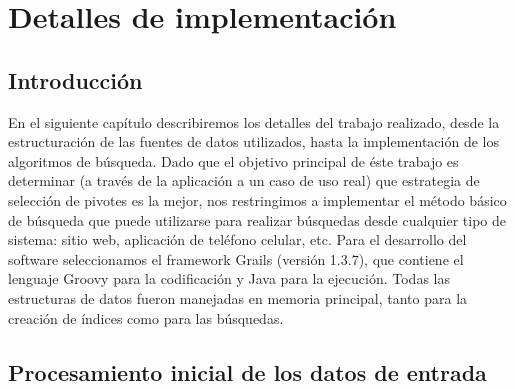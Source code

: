 \chapter{Detalles de implementaci\'on}

\section{Introducci\'on}
En el siguiente cap\'itulo describiremos los detalles del trabajo realizado, 
desde la estructuraci\'on de las fuentes de datos utilizados, hasta la 
implementaci\'on de los algoritmos de b\'usqueda.
Dado que el objetivo principal de \'este trabajo es determinar (a trav\'es de 
la aplicaci\'on a un caso de uso real) que estrategia de selecci\'on de pivotes 
es la mejor, nos restringimos a implementar el m\'etodo b\'asico de b\'usqueda que 
puede utilizarse para realizar b\'usquedas desde cualquier tipo de sistema: sitio 
web, aplicaci\'on de tel\'efono celular, etc.
Para el desarrollo del software seleccionamos el framework Grails (versi\'on 
1.3.7), que contiene el lenguaje Groovy para la codificaci\'on y Java para la 
ejecuci\'on.
Todas las estructuras de datos fueron manejadas en memoria principal, tanto 
para la creaci\'on de \'indices como para las b\'usquedas.


\section{Procesamiento inicial de los datos de entrada}

